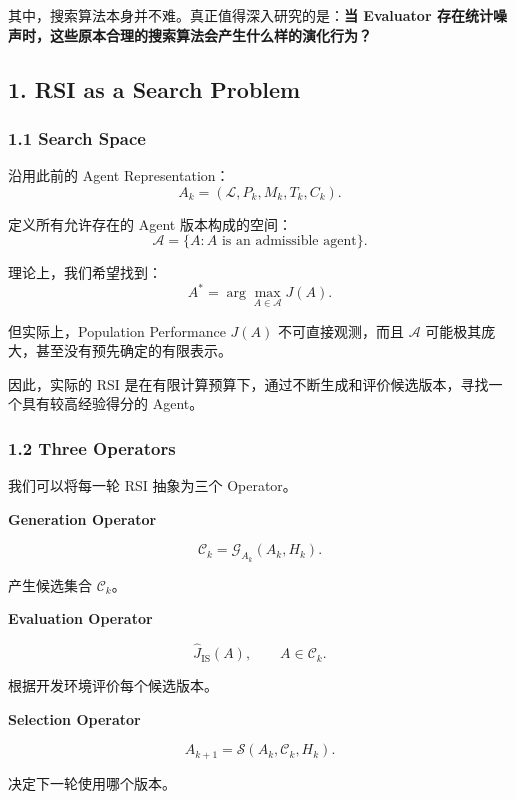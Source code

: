 其中，搜索算法本身并不难。真正值得深入研究的是：\textbf{当 Evaluator 存在统计噪声时，这些原本合理的搜索算法会产生什么样的演化行为？}

\hypertarget{part-3-40-0001-rsi-as-a-search-problem}{%
\subsection{1. RSI as a Search Problem}\label{part-3-40-0001-rsi-as-a-search-problem}}

\hypertarget{part-3-40-0001-search-space}{%
\subsubsection{1.1 Search Space}\label{part-3-40-0001-search-space}}

沿用此前的 Agent Representation：
\[A_k=(\mathcal L,P_k,M_k,T_k,C_k).\]

定义所有允许存在的 Agent 版本构成的空间：
\[\mathcal A=\{A:A\text{ is an admissible agent}\}.\]

理论上，我们希望找到：
\[A^*=\arg\max_{A\in\mathcal A}J(A).\]

但实际上，Population Performance \(J(A)\) 不可直接观测，而且 \(\mathcal A\) 可能极其庞大，甚至没有预先确定的有限表示。

因此，实际的 RSI 是在有限计算预算下，通过不断生成和评价候选版本，寻找一个具有较高经验得分的 Agent。

\hypertarget{part-3-40-0001-three-operators}{%
\subsubsection{1.2 Three Operators}\label{part-3-40-0001-three-operators}}

我们可以将每一轮 RSI 抽象为三个 Operator。

\textbf{Generation Operator}

\[\mathcal C_k=\mathcal G_{A_k}(A_k,H_k).\]

产生候选集合 \(\mathcal C_k\)。

\textbf{Evaluation Operator}

\[\widehat J_{\mathrm{IS}}(A),
\qquad A\in\mathcal C_k.\]

根据开发环境评价每个候选版本。

\textbf{Selection Operator}

\[A_{k+1}
=
\mathcal S(A_k,\mathcal C_k,H_k).\]

决定下一轮使用哪个版本。


